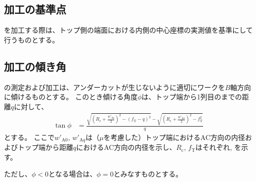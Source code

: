 \subsection{\Dimple 加工の基準点}
\Dimple を加工する際は、トップ側の端面における内側の中心座標の実測値を基準にして行うものとする。


\subsection{\Dimple 加工の傾き角}
\Dimple の測定および加工は、アンダーカットが生じないように適切にワークを$B$軸方向に傾けるものとする。
このとき傾ける角度$\phi$は、トップ端から1列目の\nameDimple までの距離$q$に対して、
\begin{align*}
  \tan\phi
  &= \frac{\displaystyle
           \sqrt{\left(R_\mathrm c+\frac{w'_{\mathrm Aq}}2\right)^2-(f_\mathrm T-q)^2}
           -\sqrt{\left(R_\mathrm c+\frac{w'_{\mathrm A0}}2\right)^2-f_\mathrm T^2}}q
\end{align*}
とする。
ここで$w'_{\mathrm A0}$, $w'_{\mathrm Aq}$は（\PlatingThk$\mu$を考慮した）トップ端におけるAC方向の内径およびトップ端から距離$q$におけるAC方向の内径を示し、$R_\mathrm c$, $f_\mathrm T$はそれぞれ\CenterCurvatureRadius, \TopAlocationLength を示す。

ただし、$\phi < 0$となる場合は、$\phi = 0$とみなすものとする。


